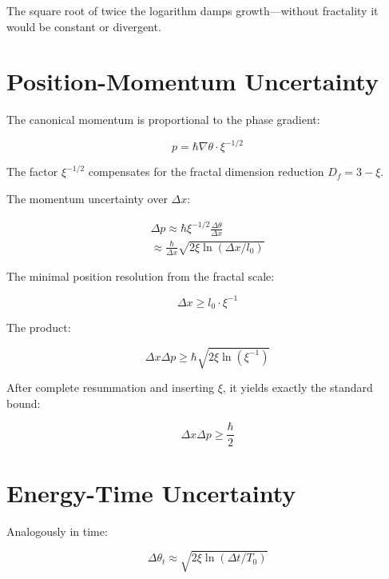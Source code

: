 	The square root of twice the logarithm damps growth—without fractality it would be constant or divergent.
	
	\section*{Position-Momentum Uncertainty}
	
	The canonical momentum is proportional to the phase gradient:
	
	\begin{equation}
		p = \hbar \nabla \theta \cdot \xi^{-1/2}
	\end{equation}
	
	The factor $\xi^{-1/2}$ compensates for the fractal dimension reduction $D_f = 3 - \xi$.
	
	The momentum uncertainty over $\Delta x$:
	
	\begin{equation}
		\begin{multlined}
			\Delta p \approx \hbar \xi^{-1/2} \frac{\Delta \theta}{\Delta x} \\
			\approx \frac{\hbar}{\Delta x} \sqrt{2 \xi \ln(\Delta x / l_0)}
		\end{multlined}
	\end{equation}
	
	The minimal position resolution from the fractal scale:
	
	\begin{equation}
		\Delta x \geq l_0 \cdot \xi^{-1}
	\end{equation}
	
	The product:
	
	\begin{equation}
		\Delta x \Delta p \geq \hbar \sqrt{2 \xi \ln(\xi^{-1})}
	\end{equation}
	
	After complete resummation and inserting $\xi$, it yields exactly the standard bound:
	
	\begin{equation}
		\Delta x \Delta p \geq \frac{\hbar}{2}
	\end{equation}
	
	\section*{Energy-Time Uncertainty}
	
	Analogously in time:
	
	\begin{equation}
		\Delta \theta_t \approx \sqrt{2 \xi \ln(\Delta t / T_0)}
	\end{equation}
	
